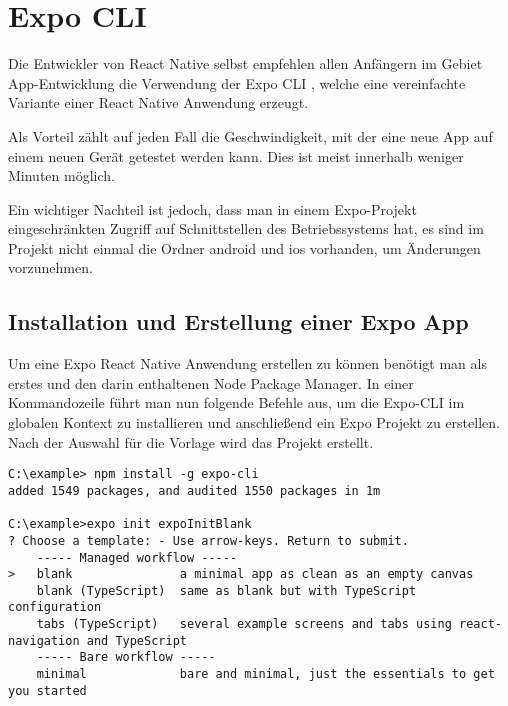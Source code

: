\section{Expo CLI}
\label{expocli}
Die Entwickler von React Native selbst empfehlen allen Anfängern im Gebiet App-Entwicklung die
Verwendung der Expo CLI \cite{expocli}, welche eine vereinfachte Variante einer React Native Anwendung erzeugt.

Als Vorteil zählt auf jeden Fall die Geschwindigkeit, mit der eine neue App auf einem neuen Gerät
getestet werden kann. Dies ist meist innerhalb weniger Minuten möglich.

Ein wichtiger Nachteil ist jedoch, dass man in einem Expo-Projekt eingeschränkten Zugriff auf
Schnittstellen des Betriebssystems hat, es sind im Projekt nicht einmal die Ordner android und ios
vorhanden, um Änderungen vorzunehmen.

\subsection{Installation und Erstellung einer Expo App}
Um eine Expo React Native Anwendung erstellen zu können benötigt man als erstes  und
den darin enthaltenen Node Package Manager. In einer Kommandozeile führt man nun folgende Befehle
aus, um die Expo-CLI im globalen Kontext zu installieren und anschließend ein Expo Projekt zu
erstellen. Nach der Auswahl für die Vorlage wird das Projekt erstellt.

\begin{lstlisting}
C:\example> npm install -g expo-cli
added 1549 packages, and audited 1550 packages in 1m

C:\example>expo init expoInitBlank
? Choose a template: - Use arrow-keys. Return to submit.
    ----- Managed workflow -----
>   blank               a minimal app as clean as an empty canvas
    blank (TypeScript)  same as blank but with TypeScript configuration
    tabs (TypeScript)   several example screens and tabs using react-navigation and TypeScript
    ----- Bare workflow -----
    minimal             bare and minimal, just the essentials to get you started
\end{lstlisting}

